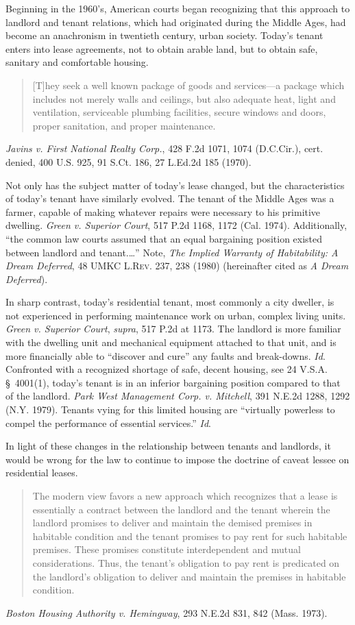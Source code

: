Beginning in the 1960's, American courts began recognizing that this approach to
landlord and tenant relations, which had originated during the Middle Ages, had
become an anachronism in twentieth century, urban society. Today's tenant
enters into lease agreements, not to obtain arable land, but to obtain safe,
sanitary and comfortable housing.  
\begin{quote}
[T]hey seek a well known package of goods and services---a package which
includes not merely walls and ceilings, but also adequate heat, light and
ventilation, serviceable plumbing facilities, secure windows and doors, proper
sanitation, and proper maintenance.
\end{quote}
\textit{Javins v. First National Realty Corp.}, 428 F.2d 1071, 1074 (D.C.Cir.),
cert. denied, 400 U.S. 925, 91 S.Ct. 186, 27 L.Ed.2d 185 (1970).

Not only has the subject matter of today's lease changed, but the
characteristics of today's tenant have similarly evolved. The tenant of the
Middle Ages was a farmer, capable of making whatever repairs were necessary to
his primitive dwelling. \textit{Green v. Superior Court}, 517 P.2d 1168, 1172
(Cal. 1974). Additionally, ``the common law courts assumed that an equal
bargaining position existed between landlord and tenant.\ldots'' Note,
\textit{The Implied Warranty of Habitability: A Dream Deferred}, 48
\textsc{UMKC L.Rev}. 237, 238 (1980) (hereinafter cited as \textit{A Dream
Deferred}).

In sharp contrast, today's residential tenant, most commonly a city dweller, is
not experienced in performing maintenance work on urban, complex living units.
\textit{Green v. Superior Court}, \textit{supra}, 517 P.2d at 1173. The
landlord is more familiar with the dwelling unit and mechanical equipment
attached to that unit, and is more financially able to ``discover and cure''
any faults and break-downs. \textit{Id}. Confronted with a recognized shortage
of safe, decent housing, see 24 V.S.A. \S~4001(1), today's tenant is in an
inferior bargaining position compared to that of the landlord. \textit{Park
West Management Corp. v. Mitchell}, 391 N.E.2d 1288, 1292 (N.Y. 1979). Tenants
vying for this limited housing are ``virtually powerless to compel the
performance of essential services.'' \textit{Id}.

In light of these changes in the relationship between tenants and landlords, it
would be wrong for the law to continue to impose the doctrine of caveat lessee
on residential leases.  
\begin{quote}
The modern view favors a new approach which recognizes that a lease is
essentially a contract between the landlord and the tenant wherein the landlord
promises to deliver and maintain the demised premises in habitable condition
and the tenant promises to pay rent for such habitable premises. These promises
constitute interdependent and mutual considerations. Thus, the tenant's
obligation to pay rent is predicated on the landlord's obligation to deliver
and maintain the premises in habitable condition.  
\end{quote}
\textit{Boston Housing Authority v. Hemingway}, 293 N.E.2d 831, 842 (Mass.
1973).


